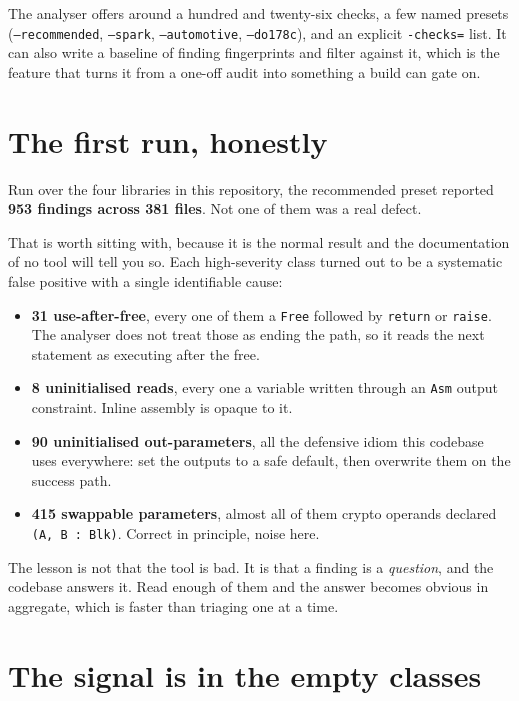 The analyser offers around a hundred and twenty-six checks, a few named presets
(\texttt{--recommended}, \texttt{--spark}, \texttt{--automotive}, \texttt{--do178c}),
and an explicit \texttt{-checks=} list. It can also write a baseline of finding
fingerprints and filter against it, which is the feature that turns it from a
one-off audit into something a build can gate on.

\section{The first run, honestly}

Run over the four libraries in this repository, the recommended preset reported
\textbf{953 findings across 381 files}. Not one of them was a real defect.

That is worth sitting with, because it is the normal result and the documentation of
no tool will tell you so. Each high-severity class turned out to be a systematic false
positive with a single identifiable cause:

\begin{itemize}
\item \textbf{31 use-after-free}, every one of them a \lstinline{Free} followed by
  \lstinline{return} or \lstinline{raise}. The analyser does not treat those as ending
  the path, so it reads the next statement as executing after the free.
\item \textbf{8 uninitialised reads}, every one a variable written through an
  \lstinline{Asm} output constraint. Inline assembly is opaque to it.
\item \textbf{90 uninitialised out-parameters}, all the defensive idiom this codebase
  uses everywhere: set the outputs to a safe default, then overwrite them on the
  success path.
\item \textbf{415 swappable parameters}, almost all of them crypto operands declared
  \lstinline{(A, B : Blk)}. Correct in principle, noise here.
\end{itemize}

The lesson is not that the tool is bad. It is that a finding is a \emph{question}, and
the codebase answers it. Read enough of them and the answer becomes obvious in
aggregate, which is faster than triaging one at a time.

\section{The signal is in the empty classes}

